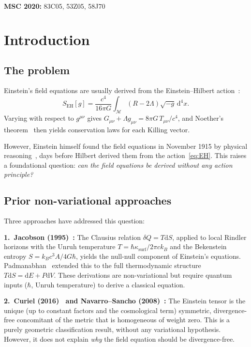 \documentclass[12pt]{article}
\theoremstyle{plain}
\theoremstyle{definition}
\theoremstyle{remark}
\newcommand{\dd}{\mathrm{d}}
\begin{document}
\noindent\textbf{MSC 2020:} 83C05, 53Z05, 58J70


\section{Introduction}
\label{sec:intro}

\subsection{The problem}

Einstein's field equations are usually derived from the Einstein--Hilbert action~\cite{hilbert1915}:
\begin{equation}\label{eq:EH}
S_{\mathrm{EH}}[g] = \frac{c^4}{16\pi G}\int_\mathcal{M}(R - 2\Lambda)\sqrt{-g}\,\dd^4x.
\end{equation}
Varying with respect to $g^{\mu\nu}$ gives $G_{\mu\nu} + \Lambda g_{\mu\nu} = 8\pi G\,T_{\mu\nu}/c^4$, and Noether's theorem~\cite{noether1918} then yields conservation laws for each Killing vector.

However, Einstein himself found the field equations in November 1915 by physical reasoning~\cite{einstein1915}, days before Hilbert derived them from the action~\eqref{eq:EH}. This raises a foundational question: \emph{can the field equations be derived without any action principle?}

\subsection{Prior non-variational approaches}

Three approaches have addressed this question:

\textbf{1.\ Jacobson (1995)~\cite{jacobson1995}:} The Clausius relation $\delta Q = T\dd S$, applied to local Rindler horizons with the Unruh temperature $T = \hbar\kappa_{\mathrm{surf}}/2\pi c k_B$ and the Bekenstein entropy $S = k_B c^3 A/4G\hbar$, yields the null-null component of Einstein's equations. Padmanabhan~\cite{padmanabhan2010} extended this to the full thermodynamic structure $T\dd S = \dd E + P\dd V$. These derivations are non-variational but require quantum inputs ($\hbar$, Unruh temperature) to derive a classical equation.

\textbf{2.\ Curiel (2016)~\cite{curiel2016} and Navarro--Sancho (2008)~\cite{navarro2008}:} The Einstein tensor is the unique (up to constant factors and the cosmological term) symmetric, divergence-free concomitant of the metric that is homogeneous of weight zero. This is a purely geometric classification result, without any variational hypothesis. However, it does not explain \emph{why} the field equation should be divergence-free.
\end{document}
